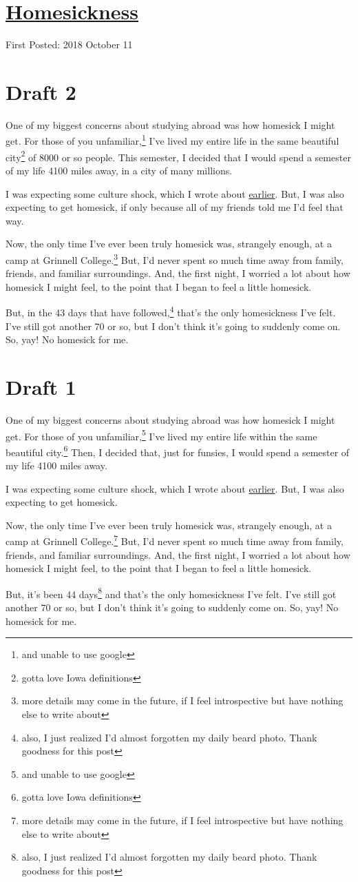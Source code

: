 \documentclass[12pt]{article}[titlepage]
\newcommand{\1}{\={a}}
\newcommand{\2}{\={e}}
\newcommand{\3}{\={\i}}
\newcommand{\4}{\=o}
\newcommand{\5}{\=u}
\newcommand{\6}{\={A}}
\renewcommand{\,}{\textsuperscript{,}}
\begin{document}
\doublespacing
\section{\href{homesickness.html}{Homesickness}}
First Posted: 2018 October 11
\section{Draft 2}
One of my biggest concerns about studying abroad was how homesick I might get.
For those of you unfamiliar,\footnote{and unable to use google} I've lived my entire life in the same beautiful city\footnote{gotta love Iowa definitions} of 8000 or so people.
This semester, I decided that I would spend a semester of my life 4100 miles away, in a city of many millions.

I was expecting some culture shock, which I wrote about \href{small-changes.html}{earlier}.
But, I was also expecting to get homesick, if only because all of my friends told me I'd feel that way.

Now, the only time I've ever been truly homesick was, strangely enough, at a camp at Grinnell College.\footnote{more details may come in the future, if I feel introspective but have nothing else to write about}
But, I'd never spent so much time away from family, friends, and familiar surroundings.
And, the first night, I worried a lot about how homesick I might feel, to the point that I began to feel a little homesick.

But, in the 43 days that have followed,\footnote{also, I just realized I'd almost forgotten my daily beard photo. Thank goodness for this post} that's the only homesickness I've felt.
I've still got another 70 or so, but I don't think it's going to suddenly come on.
So, yay!
No homesick for me.
\section{Draft 1}
One of my biggest concerns about studying abroad was how homesick I might get.
For those of you unfamiliar,\footnote{and unable to use google} I've lived my entire life within the same beautiful city.\footnote{gotta love Iowa definitions}
Then, I decided that, just for funsies, I would spend a semester of my life 4100 miles away.

I was expecting some culture shock, which I wrote about \href{small-changes.html}{earlier}.
But, I was also expecting to get homesick.

Now, the only time I've ever been truly homesick was, strangely enough, at a camp at Grinnell College.\footnote{more details may come in the future, if I feel introspective but have nothing else to write about}
But, I'd never spent so much time away from family, friends, and familiar surroundings.
And, the first night, I worried a lot about how homesick I might feel, to the point that I began to feel a little homesick.

But, it's been 44 days\footnote{also, I just realized I'd almost forgotten my daily beard photo. Thank goodness for this post} and that's the only homesickness I've felt.
I've still got another 70 or so, but I don't think it's going to suddenly come on.
So, yay!
No homesick for me.
\end{document}
